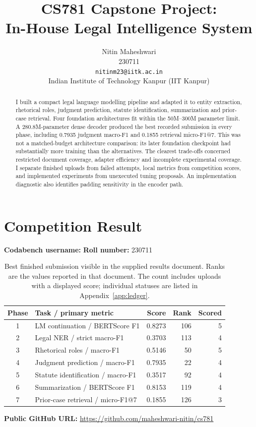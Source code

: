 \documentclass[11pt, oneside]{article}
\title{CS781 Capstone Project:\\
In-House Legal Intelligence System}
\author{Nitin Maheshwari\\230711\\{\tt nitinm23@iitk.ac.in}\\
Indian Institute of Technology Kanpur (IIT Kanpur)}
\date{}
\newcommand{\code}[1]{\texttt{\detokenize{#1}}}
\begin{document}
\maketitle
\begin{abstract}
I built a compact legal language modelling pipeline and adapted it to entity extraction, rhetorical roles,
judgment prediction, statute identification, summarization and prior-case retrieval. Four foundation
architectures fit within the 50M--300M parameter limit. A 280.8M-parameter dense decoder produced the
best recorded submission in every phase, including 0.7935 judgment macro-F1 and 0.1855 retrieval
micro-F1@7. This was not a matched-budget architecture comparison: its later foundation checkpoint
had substantially more training than the alternatives. The clearest trade-offs concerned restricted
document coverage, adapter efficiency and incomplete experimental coverage. I separate finished uploads
from failed attempts, local metrics from competition scores, and implemented experiments from unexecuted
tuning proposals. An implementation diagnostic also identifies padding sensitivity in the encoder path.
\end{abstract}

\section{Competition Result}
\noindent\textbf{Codabench username:} \code{n_230711}\hfill\textbf{Roll number:} 230711
\begin{table}[H]
\centering\small
\caption{Best finished submission visible in the supplied results document. Ranks are the values reported
in that document. The count includes uploads with a displayed score; individual statuses are listed in Appendix~\ref{app:ledger}.}
\label{tab:leaderboard}
\begin{tabular}{clrrr}
\toprule Phase & Task / primary metric & Score & Rank & Scored\\\midrule
1 & LM continuation / BERTScore F1 & 0.8273 & 106 & 5\\
2 & Legal NER / strict macro-F1 & 0.3703 & 113 & 4\\
3 & Rhetorical roles / macro-F1 & 0.5146 & 50 & 5\\
4 & Judgment prediction / macro-F1 & 0.7935 & 22 & 4\\
5 & Statute identification / macro-F1 & 0.3517 & 92 & 4\\
6 & Summarization / BERTScore F1 & 0.8153 & 119 & 4\\
7 & Prior-case retrieval / micro-F1@7 & 0.1855 & 126 & 3\\\bottomrule
\end{tabular}
\end{table}
\noindent\textbf{Public GitHub URL:} \url{https://github.com/maheshwari-nitin/cs781}
\end{document}
